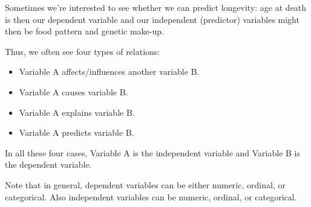 \documentclass[]{book}\usepackage[]{graphicx}\usepackage[]{color}
\begin{document}
Sometimes we're interested to see whether we can predict longevity: age at death is then our dependent variable and our independent (predictor) variables might then be food pattern and genetic make-up. 

Thus, we often see four types of relations:
\begin{itemize}
\item Variable A affects/influences another variable B.
\item Variable A causes variable B.
\item Variable A explains variable B.
\item Variable A predicts variable B.
\end{itemize}

In all these four cases, Variable A is the independent variable and Variable B is the dependent variable.

Note that in general, dependent variables can be either numeric, ordinal, or categorical. Also independent variables can be numeric, ordinal, or categorical. 
\end{document}
